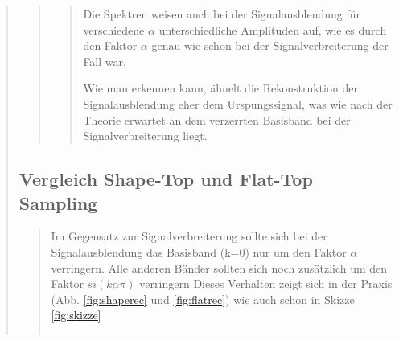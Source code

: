 \begin{quote}
\begin{quote}
\begin{quote}
             Die Spektren weisen auch bei der Signalausblendung für verschiedene $\alpha$ unterschiedliche Amplituden
             auf, wie es durch den Faktor $\alpha$ genau wie schon bei der Signalverbreiterung der Fall war.
             
             
             Wie man erkennen kann, ähnelt die Rekonstruktion der Signalausblendung eher dem Urspungssignal, was wie
             nach der Theorie erwartet an dem verzerrten Basisband bei der Signalverbreiterung liegt.
             
             
        \end{quote}
        
        
        
    \end{quote}
    
    \subsection{Vergleich Shape-Top und Flat-Top Sampling}
      \begin{quote}
      

                      
             Im Gegensatz zur Signalverbreiterung sollte sich bei der Signalausblendung das Basisband (k=0) nur um den
             Faktor $\alpha$ verringern.
             Alle anderen Bänder sollten sich noch zusätzlich um den Faktor $si(k\alpha\pi)$ verringern%
             Dieses Verhalten zeigt sich in der Praxis (Abb. \ref{fig:shaperec} und \ref{fig:flatrec}) wie auch schon
             in Skizze \ref{fig:skizze}
             
             
             
             
            \begin{center}
            \begin{tabular}{ll}
            

\end{tabular}
\end{center}
\end{quote}
\end{quote}
